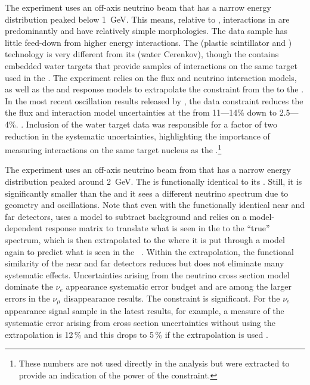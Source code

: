 The  experiment uses an off-axis neutrino beam that has a narrow energy distribution peaked below \SI{1}{GeV}. This means, relative to , interactions in  are predominantly  and have relatively simple morphologies.  The data sample has little feed-down from higher energy interactions.  The    (plastic scintillator and
 ) technology is very different from its    (water Cerenkov), though the  contains embedded water targets that provide samples of interactions on the same target used in the .
The experiment relies on the flux and neutrino interaction models, as well as the  and   response models to extrapolate the constraint from the   to the  .   In the most recent oscillation results released by , the   data constraint reduces the the flux and interaction model uncertainties at the   from %
11---14\% down to 2.5---4\%.
\cite{Abe:2018wpn}. Inclusion of the water target data was responsible for a factor of two reduction in the systematic uncertainties, highlighting the importance of measuring interactions on the same target nucleus as the .\footnote{These numbers are not used directly in the analysis but were extracted to provide an indication of the power of the  constraint.}

The    experiment uses an off-axis neutrino beam from  that has a narrow energy distribution peaked around \SI{2}{GeV}.  The      is functionally identical to its  .  Still, it is significantly smaller than the   and it sees a different neutrino spectrum due to geometry and oscillations.  Note that even with the functionally identical near and  far detectors,    uses a model to subtract  background and relies on a model-dependent response matrix to translate what is seen in the   to the ``true'' spectrum, which is then extrapolated to the   where it is put through a model again to predict what is seen in the  ~\cite{NOvA:2018gge, WolcottNUINT2018}.  Within the extrapolation, the functional similarity of the near and  far detectors reduces but does not eliminate many systematic effects.  Uncertainties arising from the neutrino cross section model dominate the    $\nu_{e}$ appearance systematic error budget and are among the larger errors in the $\nu_{\mu}$ disappearance results.  The   constraint is significant.  For the $\nu_{e}$ appearance signal sample in the latest    results, for example, a measure of the systematic error arising from cross section uncertainties without using the   extrapolation is 12\,\% and this drops to 5\,\% if the   extrapolation is used \cite{WolcottNUINT2018}.

